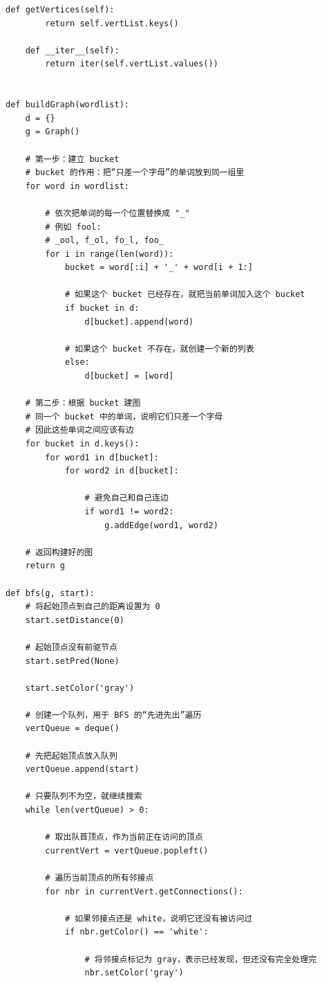 \documentclass[10pt,a4paper,fontset=none]{ctexart}
\begin{document}
\begin{lstlisting}[style=py,caption={最终可用代码（对话来源）}]
    def getVertices(self):
        return self.vertList.keys()

    def __iter__(self):
        return iter(self.vertList.values())


def buildGraph(wordlist):
    d = {}
    g = Graph()

    # 第一步：建立 bucket
    # bucket 的作用：把“只差一个字母”的单词放到同一组里
    for word in wordlist:

        # 依次把单词的每一个位置替换成 "_"
        # 例如 fool:
        # _ool, f_ol, fo_l, foo_
        for i in range(len(word)):
            bucket = word[:i] + '_' + word[i + 1:]

            # 如果这个 bucket 已经存在，就把当前单词加入这个 bucket
            if bucket in d:
                d[bucket].append(word)

            # 如果这个 bucket 不存在，就创建一个新的列表
            else:
                d[bucket] = [word]

    # 第二步：根据 bucket 建图
    # 同一个 bucket 中的单词，说明它们只差一个字母
    # 因此这些单词之间应该有边
    for bucket in d.keys():
        for word1 in d[bucket]:
            for word2 in d[bucket]:

                # 避免自己和自己连边
                if word1 != word2:
                    g.addEdge(word1, word2)

    # 返回构建好的图
    return g

def bfs(g, start):
    # 将起始顶点到自己的距离设置为 0
    start.setDistance(0)

    # 起始顶点没有前驱节点
    start.setPred(None)

    start.setColor('gray')

    # 创建一个队列，用于 BFS 的“先进先出”遍历
    vertQueue = deque()

    # 先把起始顶点放入队列
    vertQueue.append(start)

    # 只要队列不为空，就继续搜索
    while len(vertQueue) > 0:

        # 取出队首顶点，作为当前正在访问的顶点
        currentVert = vertQueue.popleft()

        # 遍历当前顶点的所有邻接点
        for nbr in currentVert.getConnections():

            # 如果邻接点还是 white，说明它还没有被访问过
            if nbr.getColor() == 'white':

                # 将邻接点标记为 gray，表示已经发现，但还没有完全处理完
                nbr.setColor('gray')


\end{lstlisting}
\end{document}
